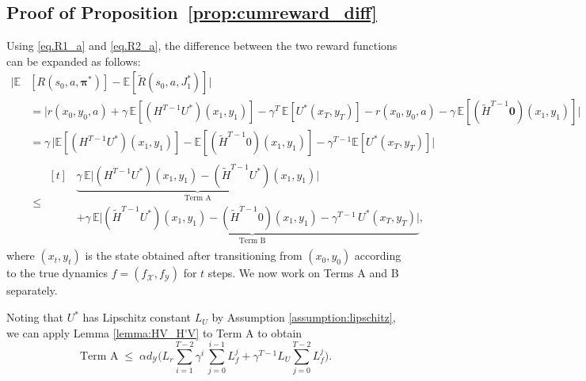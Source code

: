 \documentclass[11pt, notitlepage]{article}
\newcommand{\E}{\mathbb{E}}
\newcommand{\1}{\mathbbm{1}}
\begin{document}
\subsection{Proof of Proposition~\ref{prop:cumreward_diff}} 
\label{sec:proof_cumreward_diff}
Using \eqref{eq.R1_a} and \eqref{eq.R2_a}, the difference between the two reward functions can be expanded as follows:
\begin{align*}
    \bigl|\E &[R(s_0, a, \boldsymbol{\pi}^*)] - \E [\tilde{R}(s_0, a, J_1^*)]\bigr| \\
    &= \bigl|r(x_0,y_0,a) + \gamma \, \E [(H^{T-1} U^*) (x_1,y_1)] - \gamma^T \, \E [U^*(x_T,y_T)] - r(x_0,y_0,a) - \gamma \, \E [(\tilde{H}^{T-1} \mathbf{0}) (x_1,y_1)]\bigr|\\
    &= \gamma \, \bigl|\E [(H^{T-1} U^*) (x_1,y_1)] - \E [(\tilde{H}^{T-1} 0) (x_1,y_1)] - \gamma^{T-1} \E [U^*(x_T,y_T)]\bigr|\\
    &\leq \begin{aligned}[t]&\underbrace{\gamma \, \E \bigl| (H^{T-1} U^*) (x_1,y_1) - (\tilde{H}^{T-1} U^*)(x_1,y_1)\bigr|}_{\text{Term A}} \\
    &+ \underbrace{\gamma \, \E  \bigl|(\tilde{H}^{T-1} U^*)(x_1,y_1) - (\tilde{H}^{T-1} 0) (x_1,y_1) - \gamma^{T-1} \, U^*(x_T,y_T)\bigr|}_{\text{Term B}},\end{aligned}
\end{align*}
where $(x_t, y_t)$ is the state obtained after transitioning from $(x_0, y_0)$ according to the true dynamics $f = (f_\mathcal{X}, f_\mathcal{Y})$ for $t$ steps. We now work on Terms A and B separately. 

Noting that $U^*$ has Lipschitz constant $L_U$ by Assumption \ref{assumption:lipschitz}, we can apply Lemma \ref{lemma:HV_H'V} to Term A to obtain
\begin{equation}
\text{Term A} \; \le \; \alpha d_\mathcal{Y} \biggl( L_r \sum_{i=1}^{T-2} \gamma^i \, \sum_{j=0}^{i-1} L_f^j  +\gamma^{T-1} L_U  \sum_{j=0}^{T-2} L_f^j \biggr).
\label{eq:termA}
\end{equation}
\end{document}
